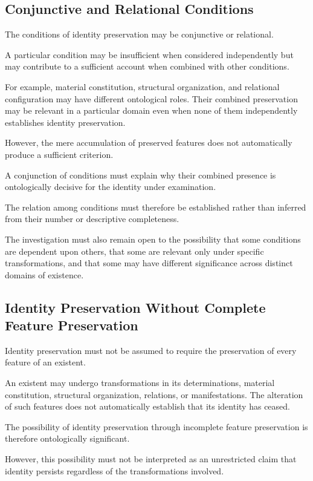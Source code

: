 \subsection{Conjunctive and Relational Conditions}

The conditions of identity preservation may be
conjunctive or relational.

A particular condition may be insufficient when
considered independently but may contribute to
a sufficient account when combined with other
conditions.

For example, material constitution, structural
organization, and relational configuration may
have different ontological roles. Their combined
preservation may be relevant in a particular
domain even when none of them independently
establishes identity preservation.

However, the mere accumulation of preserved
features does not automatically produce a sufficient
criterion.

A conjunction of conditions must explain why
their combined presence is ontologically decisive
for the identity under examination.

The relation among conditions must therefore
be established rather than inferred from their
number or descriptive completeness.

The investigation must also remain open to the
possibility that some conditions are dependent
upon others, that some are relevant only under
specific transformations, and that some may
have different significance across distinct
domains of existence.

\subsection{Identity Preservation Without Complete Feature Preservation}

Identity preservation must not be assumed to
require the preservation of every feature of
an existent.

An existent may undergo transformations in
its determinations, material constitution,
structural organization, relations, or manifestations.
The alteration of such features does not
automatically establish that its identity has
ceased.

The possibility of identity preservation through
incomplete feature preservation is therefore
ontologically significant.

However, this possibility must not be interpreted
as an unrestricted claim that identity persists
regardless of the transformations involved.

